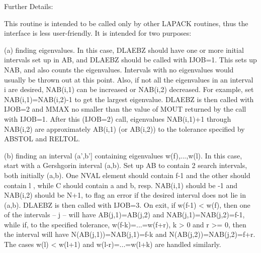 \begin{DoxyParagraph}{Further Details\+: }
\begin{DoxyVerb}      This routine is intended to be called only by other LAPACK
  routines, thus the interface is less user-friendly.  It is intended
  for two purposes:

  (a) finding eigenvalues.  In this case, DLAEBZ should have one or
      more initial intervals set up in AB, and DLAEBZ should be called
      with IJOB=1.  This sets up NAB, and also counts the eigenvalues.
      Intervals with no eigenvalues would usually be thrown out at
      this point.  Also, if not all the eigenvalues in an interval i
      are desired, NAB(i,1) can be increased or NAB(i,2) decreased.
      For example, set NAB(i,1)=NAB(i,2)-1 to get the largest
      eigenvalue.  DLAEBZ is then called with IJOB=2 and MMAX
      no smaller than the value of MOUT returned by the call with
      IJOB=1.  After this (IJOB=2) call, eigenvalues NAB(i,1)+1
      through NAB(i,2) are approximately AB(i,1) (or AB(i,2)) to the
      tolerance specified by ABSTOL and RELTOL.

  (b) finding an interval (a',b'] containing eigenvalues w(f),...,w(l).
      In this case, start with a Gershgorin interval  (a,b).  Set up
      AB to contain 2 search intervals, both initially (a,b).  One
      NVAL element should contain  f-1  and the other should contain  l
      , while C should contain a and b, resp.  NAB(i,1) should be -1
      and NAB(i,2) should be N+1, to flag an error if the desired
      interval does not lie in (a,b).  DLAEBZ is then called with
      IJOB=3.  On exit, if w(f-1) < w(f), then one of the intervals --
      j -- will have AB(j,1)=AB(j,2) and NAB(j,1)=NAB(j,2)=f-1, while
      if, to the specified tolerance, w(f-k)=...=w(f+r), k > 0 and r
      >= 0, then the interval will have  N(AB(j,1))=NAB(j,1)=f-k and
      N(AB(j,2))=NAB(j,2)=f+r.  The cases w(l) < w(l+1) and
      w(l-r)=...=w(l+k) are handled similarly.\end{DoxyVerb}
 
\end{DoxyParagraph}
\hypertarget{group__auxOTHERauxiliary_ga404759a75990a78660c741b3448b27e8}{}
